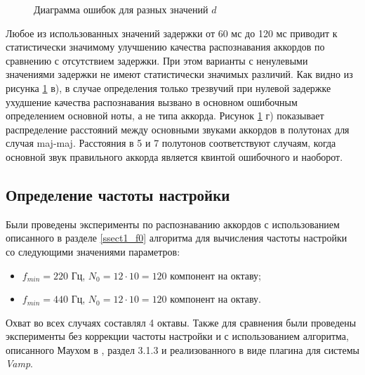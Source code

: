 \begin{figure}[htbp]
  \begin{minipage}[h]{0.49\linewidth}
  \end{minipage}
  \hfill
  \begin{minipage}[h]{0.49\linewidth}
  \end{minipage}
  \hfill
  \begin{minipage}[h]{0.49\linewidth}
  \end{minipage}
  \hfill
  \begin{minipage}[h]{0.49\linewidth}
  \end{minipage}
  \caption{Диаграмма ошибок для разных значений $d$}
  \label{img:offset}
\end{figure}

Любое из использованных значений задержки от 60 мс до 120 мс приводит к
статистически значимому улучшению качества распознавания аккордов по сравнению
с отсутствием задержки. При этом варианты с ненулевыми значениями задержки не
имеют статистически значимых различий. Как видно из рисунка \ref{img:offset} в),
в случае определения только трезвучий при нулевой задержке ухудшение качества
распознавания вызвано в основном ошибочным определением основной ноты, а не
типа аккорда. Рисунок \ref{img:offset} г) показывает распределение расстояний
между основными звуками аккордов в полутонах для случая maj-maj. Расстояния в 5
и 7 полутонов соответствуют случаям, когда основной звук правильного аккорда
является квинтой ошибочного и наоборот.

\subsection{Определение частоты настройки} \label{ssec3_tunfreq}

Были проведены эксперименты по распознаванию аккордов с использованием
описанного в разделе \ref{ssect1_f0} алгоритма для вычисления частоты настройки
со следующими значениями параметров:
\begin{itemize}
  \item $f_{min} = 220$ Гц, $N_0 = 12 \cdot 10 = 120$ компонент на октаву;
  \item $f_{min} = 440$ Гц, $N_0 = 12 \cdot 10 = 120$ компонент на октаву.
\end{itemize}
Охват во всех случаях составлял 4 октавы. Также для сравнения были проведены
эксперименты без коррекции частоты настройки и с использованием алгоритма,
описанного Маухом в \cite{MauchThesis2010}, раздел 3.1.3 и реализованного в виде
плагина для системы \emph{Vamp}.

